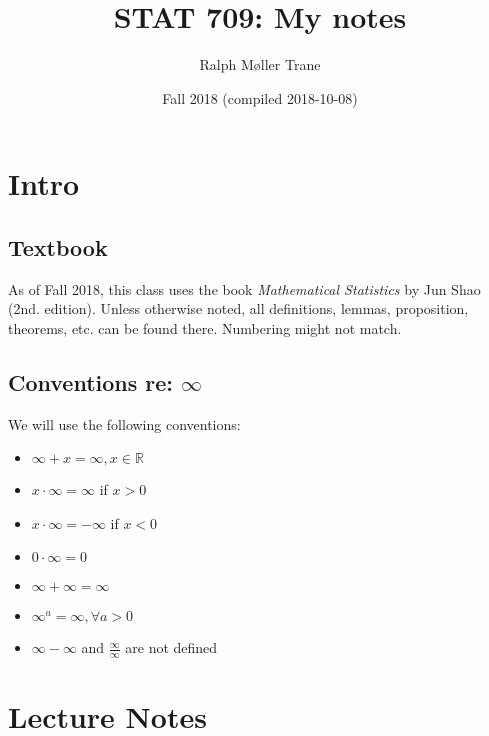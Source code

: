 \documentclass[]{book}
\title{STAT 709: My notes}
\author{Ralph Møller Trane}
\date{Fall 2018 (compiled 2018-10-08)}
\providecommand{\tightlist}{%
  \setlength{\itemsep}{0pt}\setlength{\parskip}{0pt}}
\theoremstyle{definition}
\theoremstyle{definition}
\theoremstyle{definition}
\theoremstyle{remark}
\begin{document}
\maketitle

{
\setcounter{tocdepth}{1}
\tableofcontents
}
\newcommand{\mc}[1]{\mathcal{#1}}
\renewcommand{\B}{\mathcal{B}}
\renewcommand{\C}{\mathcal{C}}
\newcommand{\F}{\mathcal{F}}

\newcommand{\mb}[1]{\mathbb{#1}}
\renewcommand{\P}{\mathbb{P}}
\newcommand{\R}{\mathbb{R}}
\newcommand{\N}{\mathbb{N}}

\newcommand{\norm}[1]{\left | \left | #1 \right | \right |}

\chapter{Intro}\label{intro}

\section{Textbook}\label{textbook}

As of Fall 2018, this class uses the book \emph{Mathematical Statistics}
by Jun Shao (2nd. edition). Unless otherwise noted, all definitions,
lemmas, proposition, theorems, etc. can be found there. Numbering might
not match.

\section{\texorpdfstring{Conventions re:
\(\infty\)}{Conventions re: \textbackslash{}infty}}\label{conventions-re-infty}

We will use the following conventions:

\begin{itemize}
\tightlist
\item
  \(\infty + x = \infty, x \in \R\)
\item
  \(x\cdot \infty = \infty\) if \(x > 0\)
\item
  \(x\cdot \infty = -\infty\) if \(x < 0\)
\item
  \(0\cdot \infty = 0\)
\item
  \(\infty + \infty = \infty\)
\item
  \(\infty^a = \infty, \forall a > 0\)
\item
  \(\infty - \infty\) and \(\frac{\infty}{\infty}\) are not defined
\end{itemize}

\chapter{Lecture Notes}\label{lectures}
\end{document}
